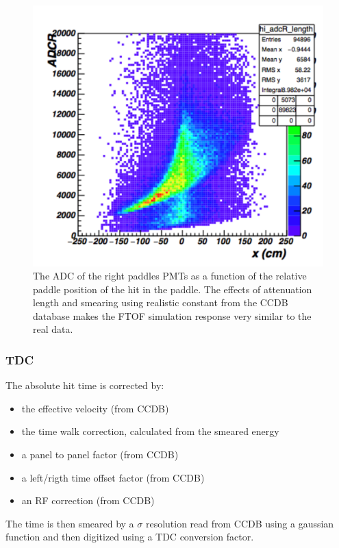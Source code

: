 \begin{figure}
	\centering
	\includegraphics[width=0.95\columnwidth,keepaspectratio]{img/ftofAtten.png}
	\caption{The ADC of the right paddles PMTs as a function of the relative paddle position of the hit in the paddle. The effects of attenuation
				length and smearing using realistic constant from the CCDB database makes the FTOF simulation response very similar to the real data.}
	\label{fig:ftofAtten}
\end{figure}


\subsubsection{TDC}

The absolute hit time is corrected by:

\begin{itemize}
	\item the effective velocity (from CCDB)
	\item the time walk correction, calculated from the smeared energy
	\item a panel to panel factor (from CCDB)
	\item a left/rigth time offset factor (from CCDB)
	\item an RF correction (from CCDB)
\end{itemize}

The time is then smeared by a $\sigma$ resolution read from CCDB using a gaussian function and then digitized using a TDC conversion factor.

